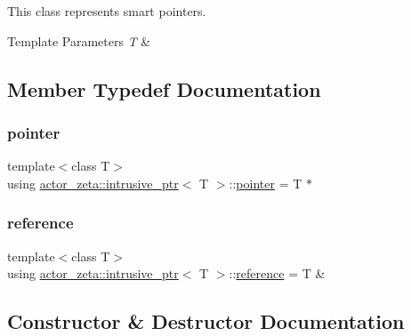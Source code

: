 This class represents smart pointers. 


\begin{DoxyTemplParams}{Template Parameters}
{\em T} & \\
\hline
\end{DoxyTemplParams}


\subsection{Member Typedef Documentation}
\mbox{\label{classactor__zeta_1_1intrusive__ptr_a149a1cdd3f154db67d7f53a371bfc4e4}} 
\subsubsection{\texorpdfstring{pointer}{pointer}}
{\footnotesize\ttfamily template$<$class T$>$ \\
using \hyperlink{classactor__zeta_1_1intrusive__ptr}{actor\+\_\+zeta\+::intrusive\+\_\+ptr}$<$ T $>$\+::\hyperlink{classactor__zeta_1_1intrusive__ptr_a149a1cdd3f154db67d7f53a371bfc4e4}{pointer} =  T $\ast$}

\mbox{\label{classactor__zeta_1_1intrusive__ptr_a016742eccc554bd6f7af0db0cf584abb}} 
\subsubsection{\texorpdfstring{reference}{reference}}
{\footnotesize\ttfamily template$<$class T$>$ \\
using \hyperlink{classactor__zeta_1_1intrusive__ptr}{actor\+\_\+zeta\+::intrusive\+\_\+ptr}$<$ T $>$\+::\hyperlink{classactor__zeta_1_1intrusive__ptr_a016742eccc554bd6f7af0db0cf584abb}{reference} =  T \&}



\subsection{Constructor \& Destructor Documentation}
\mbox{\label{classactor__zeta_1_1intrusive__ptr_aa0f955af381516d7cf298e79d83b708f}} 
